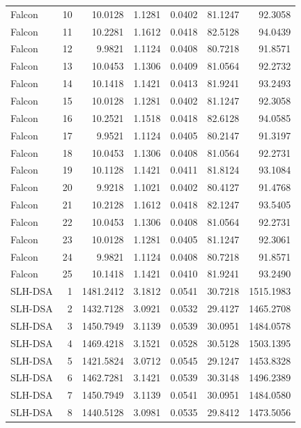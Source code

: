 \documentclass[11pt,a4paper]{article}
\begin{document}
{\begin{longtable}{l r r r r r r}
Falcon    & 10 &   10.0128 & 1.1281 & 0.0402 & 81.1247 &    92.3058 \\
Falcon    & 11 &   10.2281 & 1.1612 & 0.0418 & 82.5128 &    94.0439 \\
Falcon    & 12 &    9.9821 & 1.1124 & 0.0408 & 80.7218 &    91.8571 \\
Falcon    & 13 &   10.0453 & 1.1306 & 0.0409 & 81.0564 &    92.2732 \\
Falcon    & 14 &   10.1418 & 1.1421 & 0.0413 & 81.9241 &    93.2493 \\
Falcon    & 15 &   10.0128 & 1.1281 & 0.0402 & 81.1247 &    92.3058 \\
Falcon    & 16 &   10.2521 & 1.1518 & 0.0418 & 82.6128 &    94.0585 \\
Falcon    & 17 &    9.9521 & 1.1124 & 0.0405 & 80.2147 &    91.3197 \\
Falcon    & 18 &   10.0453 & 1.1306 & 0.0408 & 81.0564 &    92.2731 \\
Falcon    & 19 &   10.1128 & 1.1421 & 0.0411 & 81.8124 &    93.1084 \\
Falcon    & 20 &    9.9218 & 1.1021 & 0.0402 & 80.4127 &    91.4768 \\
Falcon    & 21 &   10.2128 & 1.1612 & 0.0418 & 82.1247 &    93.5405 \\
Falcon    & 22 &   10.0453 & 1.1306 & 0.0408 & 81.0564 &    92.2731 \\
Falcon    & 23 &   10.0128 & 1.1281 & 0.0405 & 81.1247 &    92.3061 \\
Falcon    & 24 &    9.9821 & 1.1124 & 0.0408 & 80.7218 &    91.8571 \\
Falcon    & 25 &   10.1418 & 1.1421 & 0.0410 & 81.9241 &    93.2490 \\
\midrule
SLH-DSA   &  1 & 1481.2412 & 3.1812 & 0.0541 & 30.7218 & 1515.1983 \\
SLH-DSA   &  2 & 1432.7128 & 3.0921 & 0.0532 & 29.4127 & 1465.2708 \\
SLH-DSA   &  3 & 1450.7949 & 3.1139 & 0.0539 & 30.0951 & 1484.0578 \\
SLH-DSA   &  4 & 1469.4218 & 3.1521 & 0.0528 & 30.5128 & 1503.1395 \\
SLH-DSA   &  5 & 1421.5824 & 3.0712 & 0.0545 & 29.1247 & 1453.8328 \\
SLH-DSA   &  6 & 1462.7281 & 3.1421 & 0.0539 & 30.3148 & 1496.2389 \\
SLH-DSA   &  7 & 1450.7949 & 3.1139 & 0.0541 & 30.0951 & 1484.0580 \\
SLH-DSA   &  8 & 1440.5128 & 3.0981 & 0.0535 & 29.8412 & 1473.5056 \\

\end{longtable}}
\end{document}
